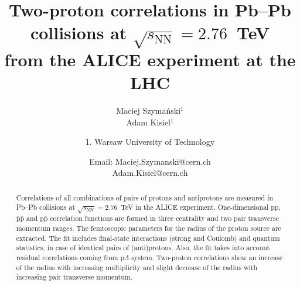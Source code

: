 \documentclass[ALICE,manyauthors]{ALICE_internal_notes}
\newcommand{\Kzs}{\mbox{$\mathrm {K^0_S}$}}
\begin{document}
%
%
%
\begin{titlepage}
%
%
%
\title{Two-proton correlations in Pb--Pb collisions at $\sqrt{s_{\mathrm{NN}}}=2{.}76$~TeV \\ from the ALICE experiment at the LHC}
%
\author{Maciej Szyma\'nski$^{1}$ \\ Adam Kisiel$^{1}$}
\author{
1. Warsaw University of Technology\\
}
\author{Email: Maciej.Szymanski@cern.ch \\ Adam.Kisiel@cern.ch}
%
%
\begin{abstract}
Correlations of all combinations of pairs of protons and antiprotons are measured in Pb--Pb collisions at $\sqrt{s_{\mathrm{NN}}}=2.76$~TeV in the ALICE experiment. One-dimensional pp, $\bar{\mathrm{p}}\bar{\mathrm{p}}$ and p$\bar{\mathrm{p}}$ correlation functions are formed in three centrality and two pair transverse momentum ranges. The femtoscopic parameters for the radius of the proton source are extracted. The fit includes final-state interactions (strong and Coulomb) and quantum statistics, in case of identical pairs of (anti)protons. Also, the fit takes into account residual correlations coming from p$\Lambda$ system. Two-proton correlations show an increase of the radius with increasing multiplicity and slight decrease of the radius with increasing  pair transverse momentum.%
\end{abstract}
\end{titlepage}
%
\tableofcontents

\end{document}
